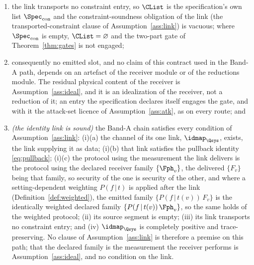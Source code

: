 \begin{theorem}
\begin{enumerate}[label=(\roman*),leftmargin=2.2em]
receiver segment is the identity link.
\emph{So both conditions that a general chain has to decide on computed data
are met here by exhibition}, and what a verified pullback identity and a
verified source identity buy on a general chain holds on this path without
appeal to any obligation of the chain's : measuring the
family the link delivers after $\idmap$ reproduces the physical statistics,
$\tr[F_v\,\idmap(\rho)]=\tr[\Fph_v\,\rho]$ for every $v$ and every operator
$\rho$, and $\idmap$ is exactly trace-preserving \emph{by exhibition}, the
supplied channel data being exactly that map rather than binary64 data
trusted to be trace-preserving, so its adjoint is unital and summing the
pullback identity over $v$ returns $\sum_v\Fph_v=\idon{}$, which on this path
is the same statement as (C3)'s own completeness, $\{\Fph_v\}$ being
$\{F_v\}$: the identity holds as a triviality and carries no content this
path did not already have;
\item the link transports no constraint entry, so $\CList$ is the
specification's own list $\Spec_{\mathrm{con}}$ and the constraint-soundness
obligation of the link (the transported-constraint clause of
Assumption~\ref{ass:link}) is vacuous; where $\Spec_{\mathrm{con}}$ is empty,
$\CList=\varnothing$ and the two-part gate of Theorem~\ref{thm:gates} is not
engaged;
\item consequently no emitted slot, and no claim of this contract used in the
Band-A path, depends on an artefact of the receiver module or of the
reductions module. The residual physical content of the receiver is
Assumption~\ref{ass:ideal}, and it is an idealization of the receiver, not a
reduction of it; an entry the specification declares itself engages the
gate, and with it the attack-set licence of Assumption~\ref{ass:atk}, as on
every route; and
\item \emph{(the identity link is sound)} the Band-A chain satisfies every
condition of Assumption~\ref{ass:link}: (i)(a) the channel of its one link,
$\idmap_{\Qsys}$, exists, the link supplying it as data; (i)(b) that link
satisfies the pullback identity \eqref{eq:pullback}; (i)(c) the protocol
using the measurement the link delivers is the protocol using the declared
receiver family $\{\Fph_v\}$, the delivered $\{F_v\}$ being that family, so
security of the one is security of the other, and where a setting-dependent
weighting $P(f\,|\,t)$ is applied after the link
(Definition~\ref{def:weighted}), the emitted family
$\{P(f\,|\,t(v))\,F_v\}$ is the identically weighted declared family
$\{P(f\,|\,t(v))\,\Fph_v\}$, so the same holds of the weighted protocol; (ii) its source segment is empty; (iii) its link transports no
constraint entry; and (iv) $\idmap_{\Qsys}$ is completely positive and
trace-preserving. No clause of Assumption~\ref{ass:link} is therefore a
premise on this path; that the declared family is the measurement the
receiver performs is Assumption~\ref{ass:ideal}, and no condition on the link.
\end{enumerate}
\end{theorem}


